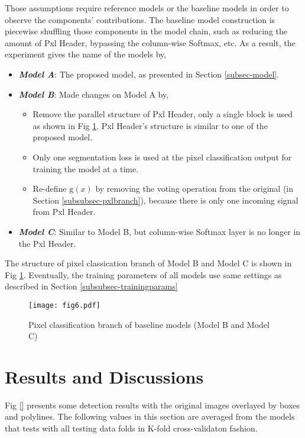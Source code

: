 \documentclass[default,pdflatex,iicol]{sn-jnl}%
\begin{document}
Those assumptions require reference models or the baseline models in order to observe the components' contributions. The baseline model construction is piecewise shuffling those components in the model chain, such as reducing the amount of Pxl Header, bypassing the column-wise Softmax, etc. As a result, the experiment gives the name of the models by,
\begin{itemize} 
\item[] \emph{\textbf{Model A}}: The proposed model, as presented in Section \ref{subsec-model}. \\
\item[] \emph{\textbf{Model B}}: Made changes on Model A by,
	\begin{itemize}
  	\item Remove the parallel structure of Pxl Header, only a single block is used as shown in Fig \ref{fig6-baselinePxlHeader}. Pxl Header's structure is similar to one of the proposed model. 
  	\item Only one segmentation loss is used at the pixel classification output for training the model at a time.
  	\item Re-define $\mathrm{g}(x)$ by removing the voting operation from the original (in Section \ref{subsubsec-pxlbranch}), because there is only one incoming signal from Pxl Header.
	\end{itemize}
\item[] \emph{\textbf{Model C}}: Similar to Model B, but column-wise Softmax layer is no longer in the Pxl Header.
\end{itemize}

The structure of pixel classication branch of Model B and Model C is shown in Fig \ref{fig6-baselinePxlHeader}. Eventually, the training parameters of all models use same settings as described in Section \ref{subsubsec-trainingparams}

\begin{figure}[h]%
\centering
\texttt{[image: fig6.pdf]}
\caption{Pixel classification branch of baseline models (Model B and Model C)}\label{fig6-baselinePxlHeader}
\end{figure}

\section{Results and Discussions}\label{sec-results}
Fig \ref{} presents some detection results with the original images overlayed by boxes and polylines. The following values in this section are averaged from the models that tests with all testing data folds in K-fold cross-validaton fashion.
\end{document}
